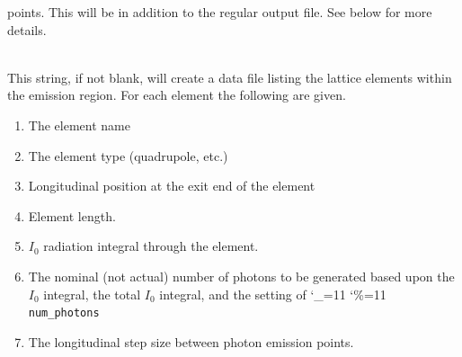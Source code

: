 \documentclass[11pt]{article}
\newcommand\ttcmd{\begingroup\catcode`\_=11 \catcode`\%=11 \dottcmd}
\newcommand\dottcmd[1]{\texttt{#1}\endgroup}
\newcommand{\vn}{\ttcmd}
\newcommand{\Newline}{\hfil \\}
\begin{document}
\begin{description}
points. This will be in addition to the regular output file.  See
below for more details.
  \item[\vn{lat_ele_file}] \Newline
This string, if not blank, will create a data file listing  the lattice
elements within the emission region. For each element the following are given. 
  \begin{enumerate}
  \item
    The element name
  \item
    The element type (quadrupole, etc.)
  \item
    Longitudinal position at the exit end of the element
  \item
    Element length.
  \item
    $I_0$ radiation integral through the element.
  \item
    The nominal (not actual) number of photons to be generated based upon the $I_0$ integral,
    the total $I_0$ integral, and the setting of \vn{num_photons}
  \item
    The longitudinal step size between photon emission points.
  \end{enumerate}


\end{description}
\end{document}

